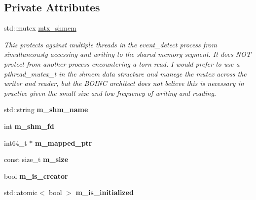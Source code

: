 \subsection*{Private Attributes}
\begin{DoxyCompactItemize}
\item 
\mbox{\label{classEventDetect_1_1SharedMemoryTimestampExporter_a72130d04dc2f356a4dae835174cbc5ae}} 
std\+::mutex \mbox{\hyperlink{classEventDetect_1_1SharedMemoryTimestampExporter_a72130d04dc2f356a4dae835174cbc5ae}{mtx\+\_\+shmem}}
\begin{DoxyCompactList}\small\item\em This protects against multiple threads in the event\+\_\+detect process from simultaneously accessing and writing to the shared memory segment. It does N\+OT protect from another process encountering a torn read. I would prefer to use a pthread\+\_\+mutex\+\_\+t in the shmem data structure and manege the mutex across the writer and reader, but the B\+O\+I\+NC architect does not believe this is necessary in practice given the small size and low frequency of writing and reading. \end{DoxyCompactList}\item 
\mbox{\label{classEventDetect_1_1SharedMemoryTimestampExporter_a0ad48e2017a4d1092d798d51292a4c19}} 
std\+::string {\bfseries m\+\_\+shm\+\_\+name}
\item 
\mbox{\label{classEventDetect_1_1SharedMemoryTimestampExporter_a78c29a6554cbf4aadba4f356351874f0}} 
int {\bfseries m\+\_\+shm\+\_\+fd}
\item 
\mbox{\label{classEventDetect_1_1SharedMemoryTimestampExporter_ae421bd2ad07ce4f853f9a057e750bac7}} 
int64\+\_\+t $\ast$ {\bfseries m\+\_\+mapped\+\_\+ptr}
\item 
\mbox{\label{classEventDetect_1_1SharedMemoryTimestampExporter_a05b8f56830e36ec0565a6bd604cba15a}} 
const size\+\_\+t {\bfseries m\+\_\+size}
\item 
\mbox{\label{classEventDetect_1_1SharedMemoryTimestampExporter_a5a741cfc2329506bd860836aedd670e4}} 
bool {\bfseries m\+\_\+is\+\_\+creator}
\item 
\mbox{\label{classEventDetect_1_1SharedMemoryTimestampExporter_a17214ef7c5a2e0c2b1b4b86529b471f9}} 
std\+::atomic$<$ bool $>$ {\bfseries m\+\_\+is\+\_\+initialized}
\end{DoxyCompactItemize}


